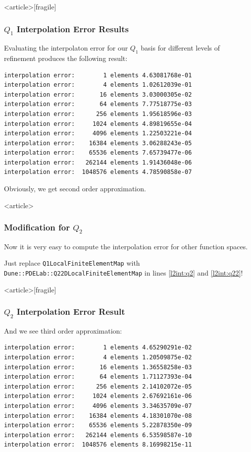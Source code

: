 \begin{frame}<article>[fragile]
\frametitle{$Q_1$ Interpolation Error Results}
Evaluating the interpolaton error for our $Q_1$ basis for different
levels of refinement produces the following result:
\begin{lstlisting}[basicstyle=\scriptsize]
interpolation error:        1 elements 4.63081768e-01
interpolation error:        4 elements 1.02612039e-01
interpolation error:       16 elements 3.03000305e-02
interpolation error:       64 elements 7.77518775e-03
interpolation error:      256 elements 1.95618596e-03
interpolation error:     1024 elements 4.89819655e-04
interpolation error:     4096 elements 1.22503221e-04
interpolation error:    16384 elements 3.06288243e-05
interpolation error:    65536 elements 7.65739477e-06
interpolation error:   262144 elements 1.91436048e-06
interpolation error:  1048576 elements 4.78590858e-07
\end{lstlisting}
Obviously, we get second order approximation.
\end{frame}

\begin{frame}<article>
\frametitle{Modification for $Q_2$}
Now it is very easy to compute the interpolation error for other
function spaces.

Just replace \lstinline{Q1LocalFiniteElementMap}
with \lstinline{Dune::PDELab::Q22DLocalFiniteElementMap} in
lines \ref{l2int:q2} and \ref{l2int:q22}!
\end{frame}

%

\begin{frame}<article>[fragile]
\frametitle{$Q_2$ Interpolation Error Result}
And we see third order approximation:
\begin{lstlisting}[basicstyle=\scriptsize]
interpolation error:        1 elements 4.65290291e-02
interpolation error:        4 elements 1.20509875e-02
interpolation error:       16 elements 1.36558258e-03
interpolation error:       64 elements 1.71127393e-04
interpolation error:      256 elements 2.14102072e-05
interpolation error:     1024 elements 2.67692161e-06
interpolation error:     4096 elements 3.34635709e-07
interpolation error:    16384 elements 4.18301070e-08
interpolation error:    65536 elements 5.22878350e-09
interpolation error:   262144 elements 6.53598587e-10
interpolation error:  1048576 elements 8.16998215e-11
\end{lstlisting}
\end{frame}

\cleardoublepage
